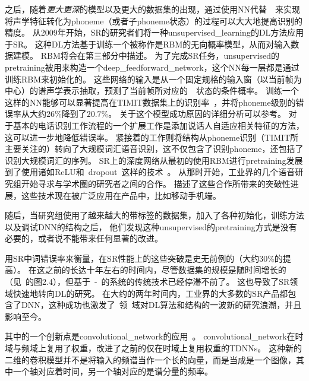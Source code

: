 之后，随着\emph{更大更深}的模型以及更大的数据集的出现，通过使用\gls{NN}代替~~来实现将声学特征转化为\gls{phoneme}（或者子\gls{phoneme}状态）的过程可以大大地提高识别的精度。
从2009年开始，\gls{SR}的研究者们将一种\gls{unsupervised_learning}的\gls{DL}方法应用于\gls{SR}。
这种\gls{DL}方法基于训练一个被称作是\gls{RBM}的无向概率模型，从而对输入数据建模。
 \gls{RBM}将会在第三部分中描述。
 为了完成\gls{SR}任务，\gls{unsupervised}的\gls{pretraining}被用来构造一个\gls{deep_feedforward_network}，这个\gls{NN}每一层都是通过训练\gls{RBM}来初始化的。
 这些网络的输入是从一个固定规格的输入窗（以当前帧为中心）的谱声学表示抽取，预测了当前帧所对应的~~状态的条件概率。
 训练一个这样的\gls{NN}能够可以显著提高在TIMIT数据集上的识别率~\citep{mohamed2009deep,Mohamed+Dahl+Hinton-2012}，并将\gls{phoneme}级别的错误率从大约$26$\%降到了$20.7$\%。
关于这个模型成功原因的详细分析可以参考\citet{mohamed2012understanding}。
对于基本的电话识别工作流程的一个扩展工作是添加说话人自适应相关特征\citep{mohamed2011deep}的方法，这可以进一步地降低错误率。
紧接着的工作则将结构从\gls{phoneme}识别（TIMIT所主要关注的）转向了大规模词汇语音识别\citep{Dahl2012}，这不仅包含了识别\gls{phoneme}，还包括了识别大规模词汇的序列。
\gls{SR}上的深度网络从最初的使用\gls{RBM}进行\gls{pretraining}发展到了使用诸如\gls{ReLU}和~\gls{dropout}~这样的技术~\citep{Zeiler+al-ICASSP-2013,Dahl-et-al-ICASSP2013}。
从那时开始，工业界的几个语音研究组开始寻求与学术圈的研究者之间的合作。
\citet{Hinton-et-al-2012}描述了这些合作所带来的突破性进展，这些技术现在被广泛应用在产品中，比如移动手机端。

随后，当研究组使用了越来越大的带标签的数据集，加入了各种初始化，训练方法以及调试\gls{DNN}的结构之后，
他们发现这种\gls{unsupervised}的\gls{pretraining}方式是没有必要的，或者说不能带来任何显著的改进。

用\gls{SR}中词错误率来衡量，在\gls{SR}性能上的这些突破是史无前例的（大约$30$\%的提高）。
在这之前的长达十年左右的时间内，尽管数据集的规模是随时间增长的（见~\citet{Deng+Yu-2014}的图2.4），但基于~-~的系统的传统技术已经停滞不前了。
这也导致了\gls{SR}领域快速地转向\gls{DL}的研究。
在大约的两年时间内，工业界的大多数的\gls{SR}产品都包含了\gls{DNN}，这种成功也激发了~领~域对\gls{DL}算法和结构的一波新的研究浪潮，并且影响至今。

其中的一个创新点是\gls{convolutional_network}的应用~\citep{Sainath-et-al-ICASSP2013}。
\gls{convolutional_network}在时域与频域上复用了权重，改进了之前的仅在时域上复用权重的\gls{TDNNs}。
这种新的二维的卷积模型并不是将输入的频谱当作一个长的向量，而是当成是一个图像，其中一个轴对应着时间，另一个轴对应的是谱分量的频率。

